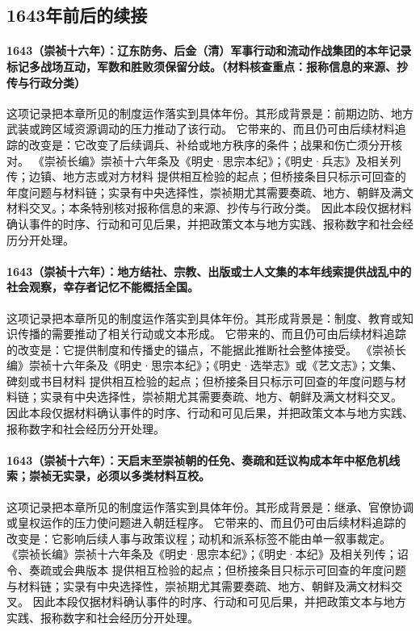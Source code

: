 \subsection{1643年前后的续接}

\paragraph{1643（崇祯十六年）：辽东防务、后金（清）军事行动和流动作战集团的本年记录标记多战场互动，军数和胜败须保留分歧。（材料核查重点：报称信息的来源、抄传与行政分类）} 这项记录把本章所见的制度运作落实到具体年份。其形成背景是：前期边防、地方武装或跨区域资源调动的压力推动了该行动。 它带来的、而且仍可由后续材料追踪的改变是：它改变了后续调兵、补给或地方秩序的条件；战果和伤亡须分开核对。 《崇祯长编》崇祯十六年条及《明史·思宗本纪》；《明史·兵志》及相关列传；边镇、地方志或对方材料 提供相互检验的起点；但桥接条目只标示可回查的年度问题与材料链；实录有中央选择性，崇祯期尤其需要奏疏、地方、朝鲜及满文材料交叉。；本条特别核对报称信息的来源、抄传与行政分类。 因此本段仅据材料确认事件的时序、行动和可见后果，并把政策文本与地方实践、报称数字和社会经历分开处理。

\paragraph{1643（崇祯十六年）：地方结社、宗教、出版或士人文集的本年线索提供战乱中的社会观察，幸存者记忆不能概括全国。} 这项记录把本章所见的制度运作落实到具体年份。其形成背景是：制度、教育或知识传播的需要推动了相关行动或文本形成。 它带来的、而且仍可由后续材料追踪的改变是：它提供制度和传播史的锚点，不能据此推断社会整体接受。 《崇祯长编》崇祯十六年条及《明史·思宗本纪》；《明史·选举志》或《艺文志》；文集、碑刻或书目材料 提供相互检验的起点；但桥接条目只标示可回查的年度问题与材料链；实录有中央选择性，崇祯期尤其需要奏疏、地方、朝鲜及满文材料交叉。 因此本段仅据材料确认事件的时序、行动和可见后果，并把政策文本与地方实践、报称数字和社会经历分开处理。

\paragraph{1643（崇祯十六年）：天启末至崇祯朝的任免、奏疏和廷议构成本年中枢危机线索；崇祯无实录，必须以多类材料互校。} 这项记录把本章所见的制度运作落实到具体年份。其形成背景是：继承、官僚协调或皇权运作的压力使问题进入朝廷程序。 它带来的、而且仍可由后续材料追踪的改变是：它影响后续人事与政策议程；动机和派系标签不能由单一叙事裁定。 《崇祯长编》崇祯十六年条及《明史·思宗本纪》；《明史·本纪》及相关列传；诏令、奏疏或会典版本 提供相互检验的起点；但桥接条目只标示可回查的年度问题与材料链；实录有中央选择性，崇祯期尤其需要奏疏、地方、朝鲜及满文材料交叉。 因此本段仅据材料确认事件的时序、行动和可见后果，并把政策文本与地方实践、报称数字和社会经历分开处理。

